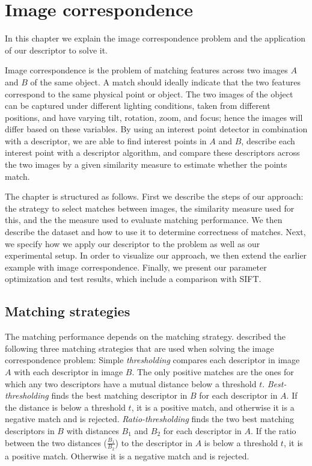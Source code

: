 \documentclass[thesis.tex]{subfiles}
\begin{document}
\chapter{Image correspondence}
\label{sec:ic}
%
In this chapter we explain the image correspondence problem and the application of our descriptor to solve it.

Image correspondence is the problem of matching features across two images $A$ and $B$ of the same object. A match should ideally indicate that the two features correspond to the same physical point or object. The two images of the object can be captured under different lighting conditions, taken from different positions, and have varying tilt, rotation, zoom, and focus; hence the images will differ based on these variables. By using an interest point detector in combination with a descriptor, we are able to find interest points in $A$ and $B$, describe each interest point with a descriptor algorithm, and compare these descriptors across the two images by a given similarity measure to estimate whether the points match.

The chapter is structured as follows. First we describe the steps of our approach: the strategy to select matches between images, the similarity measure used for this, and the the measure used to evaluate matching performance. We then describe the dataset and how to use it to determine correctness of matches. Next, we specify how we apply our descriptor to the problem as well as our experimental setup. In order to visualize our approach, we then extend the earlier example with image correspondence. Finally, we present our parameter optimization and test results, which include a comparison with SIFT.
%
\section{Matching strategies}
\label{sec:matching_strategies}
%
The matching performance depends on the matching strategy.  \citet{mikolajczyk2005performance} described the following three matching strategies that are used when solving the image correspondence problem:
Simple \emph{thresholding} compares each descriptor in image $A$ with each descriptor in image $B$. The only positive matches are the ones for which any two descriptors have a mutual distance below a threshold $t$. \emph{Best-thresholding} finds the best matching descriptor in $B$ for each descriptor in $A$. If the distance is below a threshold $t$, it is a positive match, and otherwise it is a negative match and is rejected. \emph{Ratio-thresholding} finds the two best matching descriptors in $B$ with distances $B_1$ and $B_2$ for each descriptor in $A$. If the ratio between the two distances ($\frac{B_1}{B_2}$) to the descriptor in $A$ is below a threshold $t$, it is a positive match. Otherwise it is a negative match and is rejected.
\end{document}
